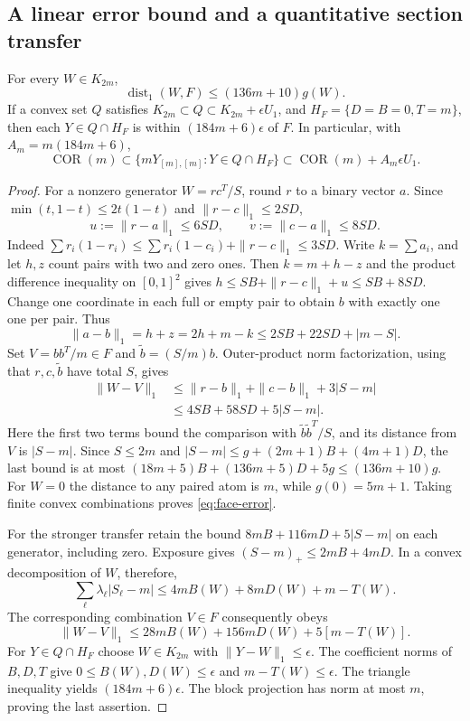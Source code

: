\subsection{A linear error bound and a quantitative section transfer}
\begin{proposition}[Stability]\label{prop:correlation-stability}
For every $W\in K_{2m}$,
\begin{equation}\label{eq:face-error}
 \operatorname{dist}_1(W,F)\le(136m+10)g(W).
\end{equation}
If a convex set $Q$ satisfies $K_{2m}\subset Q\subset K_{2m}+\epsilon U_1$,
and $H_F=\{D=B=0,T=m\}$, then each $Y\in Q\cap H_F$ is within
$(184m+6)\epsilon$ of $F$. In particular, with $A_m=m(184m+6)$,
\begin{equation}\label{eq:face-outer-transfer}
 \operatorname{COR}(m)\subset\{mY_{[m],[m]}:Y\in Q\cap H_F\}
 \subset\operatorname{COR}(m)+A_m\epsilon U_1.
\end{equation}
\end{proposition}
\begin{proof}
For a nonzero generator $W=rc^T/S$, round $r$ to a binary vector $a$.
Since $\min(t,1-t)\le2t(1-t)$ and $\|r-c\|_1\le2SD$,
\[
 u:=\|r-a\|_1\le6SD,\qquad v:=\|c-a\|_1\le8SD.
\]
Indeed $\sum r_i(1-r_i)\le\sum r_i(1-c_i)+\|r-c\|_1\le3SD$.
Write $k=\sum a_i$, and let $h,z$ count pairs with two and zero ones.
Then $k=m+h-z$ and the product difference inequality on $[0,1]^2$ gives
$h\le SB+\|r-c\|_1+u\le SB+8SD$.
Change one coordinate in each full or empty pair to obtain $b$ with exactly
one one per pair. Thus
\[
 \|a-b\|_1=h+z=2h+m-k\le2SB+22SD+|m-S|.
\]
Set $V=bb^T/m\in F$ and $\widetilde b=(S/m)b$. Outer-product norm
factorization, using that $r,c,\widetilde b$ have total $S$, gives
\begin{align*}
 \|W-V\|_1
 &\le\|r-b\|_1+\|c-b\|_1+3|S-m|\\
 &\le4SB+58SD+5|S-m|.
\end{align*}
Here the first two terms bound the comparison with
$\widetilde b\widetilde b^T/S$, and its distance from $V$ is $|S-m|$.
Since $S\le2m$ and
$|S-m|\le g+(2m+1)B+(4m+1)D$, the last bound is at most
$(18m+5)B+(136m+5)D+5g\le(136m+10)g$.
For $W=0$ the distance to any paired atom is $m$, while $g(0)=5m+1$.
Taking finite convex combinations proves \eqref{eq:face-error}.

For the stronger transfer retain the bound
$8mB+116mD+5|S-m|$ on each generator, including zero. Exposure gives
$(S-m)_+\le2mB+4mD$. In a convex decomposition of $W$, therefore,
\[
 \sum_\ell\lambda_\ell|S_\ell-m|
 \le4mB(W)+8mD(W)+m-T(W).
\]
The corresponding combination $V\in F$ consequently obeys
\[
 \|W-V\|_1\le28mB(W)+156mD(W)+5[m-T(W)].
\]
For $Y\in Q\cap H_F$ choose $W\in K_{2m}$ with
$\|Y-W\|_1\le\epsilon$. The coefficient norms of $B,D,T$ give
$0\le B(W),D(W)\le\epsilon$ and $m-T(W)\le\epsilon$.
The triangle inequality yields $(184m+6)\epsilon$.
The block projection has norm at most $m$, proving the last assertion.
\end{proof}
